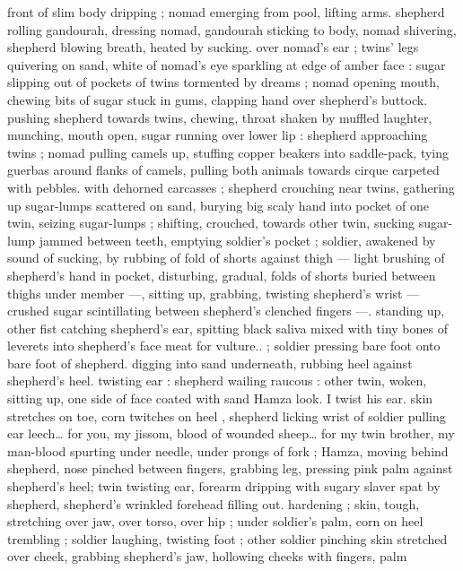 front of slim body dripping ; nomad emerging from pool, lifting arms. 
shepherd rolling gandourah, dressing nomad, gandourah sticking to 
body, nomad shivering, shepherd blowing breath, heated by sucking. 
over nomad's ear ; twins' legs quivering on sand, white of nomad's 
eye sparkling at edge of amber face : sugar slipping out of pockets 
of twins tormented by dreams ; nomad opening mouth, chewing bits 
of sugar stuck in gums, clapping hand over shepherd's buttock. 
pushing shepherd towards twins, chewing, throat shaken by muffled 
laughter, munching, mouth open, sugar running over lower lip : 
shepherd approaching twins ; nomad pulling camels up, stuffing 
copper beakers into saddle-pack, tying guerbas around flanks of 
camels, pulling both animals towards cirque carpeted with pebbles. 
with dehorned carcasses ; shepherd crouching near twins, gathering 
up sugar-lumps scattered on sand, burying big scaly hand into 
pocket of one twin, seizing sugar-lumps ; shifting, crouched, towards 
other twin, sucking sugar-lump jammed between teeth, emptying 
soldier's pocket ; soldier, awakened by sound of sucking, by rubbing 
of fold of shorts against thigh --- light brushing of shepherd's hand 
in pocket, disturbing, gradual, folds of shorts buried between thighs 
under member ---, sitting up, grabbing, twisting shepherd's wrist --- 
crushed sugar scintillating between shepherd's clenched fingers ---. 
standing up, other fist catching shepherd's ear, spitting black saliva 
mixed with tiny bones of leverets into shepherd's face{\td} {\gl} meat for 
vulture..{\gr} ; soldier pressing bare foot onto bare foot of shepherd. 
digging into sand underneath, rubbing heel against shepherd's heel. 
twisting ear : shepherd wailing raucous : other twin, woken, sitting 
up, one side of face coated with sand{\td} {\gl} Hamza{\td} look. I twist his ear. 
skin stretches on toe, corn twitches on heel{\td} {\gr}, shepherd licking wrist 
of soldier pulling ear{\td} {\gl} leech{\ldots} for you, my jissom, blood of wounded 
sheep{\ldots} for my twin brother, my man-blood spurting under needle, 
under prongs of fork{\td} {\gr} ; Hamza, moving behind shepherd, nose 
pinched between fingers, grabbing leg, pressing pink palm against 
shepherd's heel; twin twisting ear, forearm dripping with sugary 
slaver spat by shepherd, shepherd's wrinkled forehead filling out. 
hardening ; skin, tough, stretching over jaw, over torso, over hip ; 
under soldier's palm, corn on heel trembling ; soldier laughing, 
twisting foot ; other soldier pinching skin stretched over cheek, 
grabbing shepherd's jaw, hollowing cheeks with fingers, palm 
